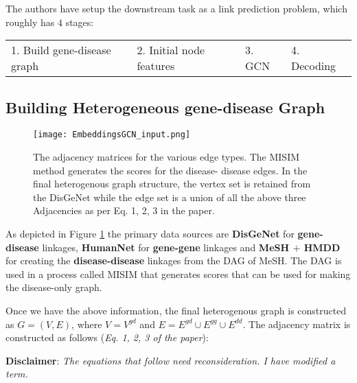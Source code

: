 \begin{sloppypar*}

    \noindent The authors have setup the downstream task as a link prediction problem,
    which roughly has $4$ stages:

    \begin{tabularx}{\textwidth}{XXXX}
        1. Build gene-disease graph & 2. Initial node features & 3. GCN & 4. Decoding
    \end{tabularx}

    \subsection{Building Heterogeneous gene-disease Graph}
        \begin{figure}
            \centering
            \texttt{[image: EmbeddingsGCN\_input.png]}
            \caption{The adjacency matrices for the various edge types. The MISIM
                    \cite{DisDisEdge} method generates the scores for the disease-
                    disease edges. In the final heterogenous graph structure, the
                    vertex set is retained from the DisGeNet while the edge set is a
                    union of all the above three Adjacencies as per Eq. 1, 2, 3
                    in the paper.}
            \label{fig:heteroinput}
        \end{figure}

        \noindent As depicted in Figure \ref{fig:heteroinput} the primary data
        sources are \textbf{DisGeNet} for \textbf{gene-disease} linkages,
        \textbf{HumanNet} for \textbf{gene-gene} linkages and \textbf{MeSH $+$ 
        HMDD} for creating the \textbf{disease-disease} linkages from the DAG of
        MeSH. The DAG is used in a process called MISIM \cite{DisDisEdge} that
        generates scores that can be used for making the disease-only graph.\hfill\break

        \noindent Once we have the above information, the final heterogenous graph
        is constructed as $G = (V, E)$, where $V = V^{gd}$ and $E = E^{gd} \cup E^{gg} \cup E^{dd}$.
        The adjacency matrix is constructed as follows (\textit{Eq. 1, 2, 3 of the paper}):

        \begin{warning}
            \textbf{Disclaimer}: \textit{The equations that follow need reconsideration.
                I have modified a term.}
        \end{warning}


\end{sloppypar*}
